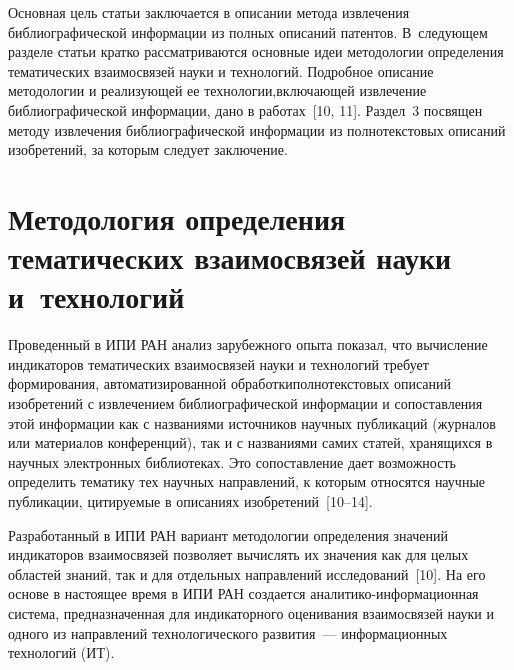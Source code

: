 \begin{multicols}{2}
    Основная цель статьи заключается в описании метода извлечения библиографической 
информации из полных описаний патентов. В~следующем разделе статьи кратко 
рассматриваются основные идеи методологии определения тематических взаимосвязей науки и 
технологий. Подробное описание методологии и реализующей ее технологии,\linebreak включающей 
извлечение библиографической информации, дано в работах~[10, 11]. Раздел~3 посвящен 
методу извлечения библиографической информа\-ции из полнотекстовых описаний изобретений, 
за которым следует заключение.

\section{Методология определения тематических взаимосвязей науки 
и~технологий}
      
    Проведенный в ИПИ РАН анализ зарубежного опыта показал, что вычисление индикаторов 
тематических взаимосвязей науки и технологий требует формирования, автоматизированной 
обработки\linebreak полнотекстовых описаний изобретений с извлечением библиографической 
информации и со\-по\-став\-ле\-ния этой информации как с названиями источников научных 
публикаций (журналов или материа\-лов конференций), так и с названиями самих статей, 
хранящихся в научных электронных биб\-лио\-те\-ках. Это сопоставление дает возможность 
определить тематику тех научных направлений, к которым относятся научные публикации, 
цитируемые в описаниях изобретений~[10--14].
    
    Разработанный в ИПИ РАН вариант методологии определения значений индикаторов 
взаимосвязей позволяет вычислять их значения как для целых областей знаний, так и для 
отдельных направлений исследований~[10]. На его основе в настоящее время в ИПИ РАН 
создается ана\-ли\-ти\-ко-ин\-фор\-ма\-ци\-он\-ная сис\-те\-ма, предназначенная для 
индикаторного оценивания взаимосвязей науки и одного из направлений технологического 
развития~--- информационных технологий (ИТ).
    

\end{multicols}
